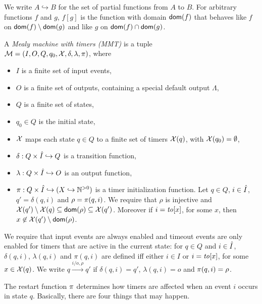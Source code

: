 We write $A \hookrightarrow B$ for the set of partial functions from $A$ to $B$.
For arbitrary functions $f$ and $g$, $f [g]$ is the function with domain ${\textsf{dom}}(f)$ that behaves like $f$
on ${\textsf{dom}}(f) \setminus {\textsf{dom}}(g)$ and like $g$ on ${\textsf{dom}}(f) \cap {\textsf{dom}}(g)$.

\begin{definition}
\label{def:MMT}
A \emph{Mealy machine with timers (MMT)} is a tuple
\\
${\cal M} = (I, O, Q, q_0, \mathcal{X}, \delta, \lambda, \pi)$, where
\begin{itemize}
\item
$I$ is a finite set of input events,
\item
$O$ is a finite set of outputs, containing a special default output $\Lambda$,
\item
$Q$ is a finite set of states,
\item
$q_0 \in Q$ is the initial state,
\item
$\mathcal{X}$ maps each state $q \in Q$ to a finite set of timers $\mathcal{X}(q)$, with $\mathcal{X}(q_0) = \emptyset$,
\item
$\delta: Q \times \hat{I} \hookrightarrow  Q$ is a transition function,
\item
$\lambda: Q \times \hat{I} \hookrightarrow O$ is an output function, 
\item
$\pi : Q \times \hat{I} \hookrightarrow (X \hookrightarrow {\mathbb N}^{>0})$ is a timer initialization function.
Let $q \in Q$, $i \in \hat{I}$, $q'=\delta(q,i)$ and $\rho=\pi(q,i)$. 
We require that $\rho$ is injective and $\mathcal{X}(q') \setminus \mathcal{X}(q) \subseteq {\textsf{dom}}(\rho) \subseteq\mathcal{X}(q')$. Moreover
  if $i=\mathit{to}[x]$, for some $x$, then $x \not\in \mathcal{X}(q') \setminus {\textsf{dom}}(\rho)$.
\end{itemize}
We require that input events are always enabled and timeout events are only enabled
for timers that are active in the current state:
for $q \in Q$ and $i \in \hat{I}$,  $\delta(q,i)$, $\lambda(q,i)$ and $\pi(q,i)$ are defined iff either
$i \in I$ or $i=\mathit{to}[x]$, for some $x \in\mathcal{X}(q)$.
We write $q \xrightarrow{i/o,\rho} q'$ if $\delta(q,i) = q'$, $\lambda(q,i)= o$ and $\pi(q,i) = \rho$.
\end{definition}
The restart function $\pi$ determines how timers are affected when an event $i$ occurs in state $q$.
Basically, there are four things that may happen.
